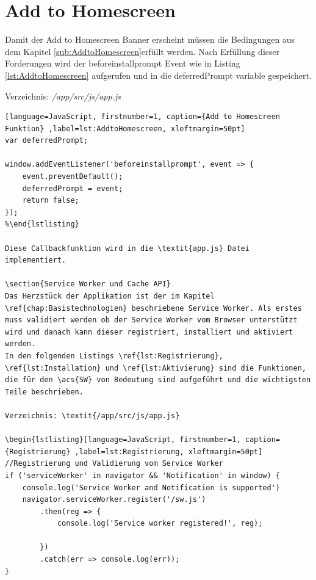 \section{Add to Homescreen}
Damit der Add to Homescreen Banner erscheint müssen die Bedingungen aus dem Kapitel \ref{sub:AddtoHomescreen}erfüllt werden.
Nach Erfüllung dieser Forderungen wird der beforeinstallprompt Event wie in Listing \ref{lst:AddtoHomescreen} aufgerufen und in die deferredPrompt variable gespeichert.

Verzeichnis: \textit{/app/src/js/app.js}

\begin{lstlisting}[language=JavaScript, firstnumber=1, caption={Add to Homescreen Funktion} ,label=lst:AddtoHomescreen, xleftmargin=50pt]
var deferredPrompt;

window.addEventListener('beforeinstallprompt', event => {
    event.preventDefault();
    deferredPrompt = event;
    return false;
});
%\end{lstlisting}

Diese Callbackfunktion wird in die \textit{app.js} Datei implementiert. 

\section{Service Worker und Cache API}
Das Herzstück der Applikation ist der im Kapitel \ref{chap:Basistechnologien} beschriebene Service Worker. Als erstes muss validiert werden ob der Service Worker vom Browser unterstützt wird und danach kann dieser registriert, installiert und aktiviert werden.
In den folgenden Listings \ref{lst:Registrierung}, \ref{lst:Installation} und \ref{lst:Aktivierung} sind die Funktionen, die für den \acs{SW} von Bedeutung sind aufgeführt und die wichtigsten Teile beschrieben.

Verzeichnis: \textit{/app/src/js/app.js}

\begin{lstlisting}[language=JavaScript, firstnumber=1, caption={Registrierung} ,label=lst:Registrierung, xleftmargin=50pt]
//Registrierung und Validierung vom Service Worker
if ('serviceWorker' in navigator && 'Notification' in window) {
    console.log('Service Worker and Notification is supported')
    navigator.serviceWorker.register('/sw.js')
        .then(reg => {
            console.log('Service worker registered!', reg);

        })
        .catch(err => console.log(err));
}
\end{lstlisting}

